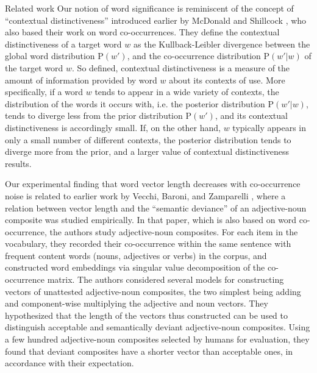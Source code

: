 \documentclass{article} %
\newcommand{\p}{\mathrm{P}}
\begin{document}
\begin{section}{Related work}\label{related-work}
Our notion of word significance is reminiscent of the concept of
``contextual distinctiveness'' introduced earlier by McDonald and
Shillcock \cite{mcdonald2001contextual}, who also based their work on word co-occurrences.
They define the contextual distinctiveness of a target word $w$ as the
Kullback-Leibler divergence
between the global word distribution $\p(w')$, and the
co-occurrence distribution $\p(w' | w)$ of the target word $w$.
So defined, contextual distinctiveness is a measure of the amount of
information provided by word $w$ about its contexts of use.  More specifically, if a
word $w$ tends to appear in a wide variety of contexts, the distribution
of the words it occurs with, i.e. the posterior distribution $\p(w' | w)$,
tends to diverge less from the prior distribution $\p(w')$, and its
contextual distinctiveness is accordingly small.  If, on the other hand,
$w$ typically appears in only a small number of different contexts, the
posterior distribution tends to diverge more from the prior, and a
larger value of contextual distinctiveness results.

Our experimental finding that word vector length decreases with
co-occurrence noise is related to earlier work by Vecchi, Baroni, and
Zamparelli \cite{vecchi-baroni-zamparelli2011}, where a relation between
vector length and the ``semantic deviance'' of an adjective-noun
composite was studied empirically.  In that paper, which is also based
on word co-occurrence, the authors study adjective-noun composites.
For each item in the vocabulary, they
recorded their co-occurrence within the same sentence with 
 frequent content words (nouns, adjectives or verbs) in the
corpus, and constructed word embeddings via 
singular value decomposition of the co-occurrence matrix.  The authors considered several models for
constructing vectors of unattested adjective-noun composites, the two
simplest being adding and component-wise multiplying the adjective and
noun vectors.  They hypothesized that the length of the vectors thus
constructed can be used to distinguish acceptable and semantically
deviant adjective-noun composites.  Using a few hundred adjective-noun
composites selected by humans for evaluation, they found that deviant
composites have a shorter vector than acceptable ones, in accordance
with their expectation.


\end{section}
\end{document}
